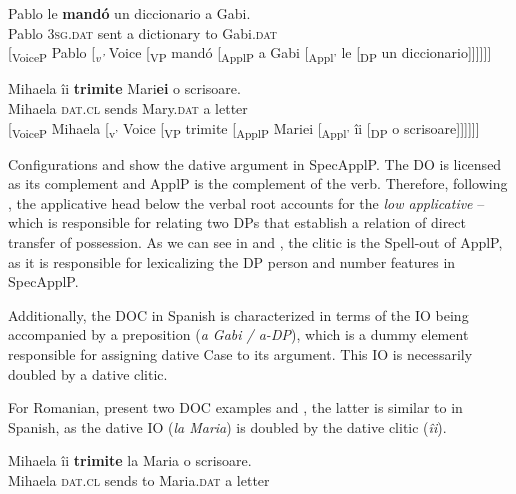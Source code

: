 \documentclass[output=paper,colorlinks,citecolor=brown,nonflat]{./langscibook}
\begin{document}
\ea%
    \label{ex:calindro:4}
    \ea\label{ex:calindro:4a}
    \gll Pablo {le}               \textbf{mandó} un diccionario  {a} {Gabi}. \\
    Pablo \textsc{3sg.dat}  sent      a dictionary     to Gabi.\textsc{dat}\\
    \ex\label{ex:calindro:4b}{}
    [\textsubscript{VoiceP} Pablo [\textit{\textsubscript{v’}} Voice [\textsubscript{VP} mandó [\textsubscript{ApplP} a Gabi [\textsubscript{Appl’} {le} [\textsubscript{DP} un diccionario]]]]]] \hfill \citep[35]{Cuervo2003}
    \z
\z

\ea%
    \label{ex:calindro:5}
    \ea\label{ex:calindro:5a}
    \gll Mihaela  {îi}             \textbf{trimite}   {Mari}\textbf{{ei}}         o scrisoare. \\
    Mihaela  \textsc{dat.cl}  sends   Mary.\textsc{dat}  a letter \\
    \ex\label{ex:calindro:5b}{}
    [\textsubscript{VoiceP} Mihaela [{\textsubscript{v’}} Voice [\textsubscript{VP} trimite [\textsubscript{ApplP} Mariei [\textsubscript{Appl’} îi [\textsubscript{DP} o scrisoare]]]]]] \hfill \citep[2]{DiaconescuRivero2007}
    \z
\z

Configurations  and  show the dative argument in SpecApplP. The DO is licensed as its complement and ApplP is the complement of the verb. Therefore, following \citet{Pylkkänen2002}, the applicative head below the verbal root accounts for the \textit{low applicative} – which is responsible for relating two DPs that establish a relation of direct transfer of possession. As we can see in  and , the clitic is the Spell-out of ApplP, as it is responsible for lexicalizing the DP person and number features in SpecApplP. 

Additionally, the DOC in Spanish is characterized in terms of the IO being accompanied by a preposition (\textit{a Gabi / a-DP}), which is a dummy element responsible for assigning dative Case to its argument. This IO is necessarily doubled by a dative clitic. 

For Romanian, \citet{DiaconescuRivero2007} present two DOC examples  and , the latter is similar to  in Spanish, as the dative IO (\textit{la Maria}) is doubled by the dative clitic (\textit{îi}).

\ea%
    \label{ex:calindro:6}
    \gll Mihaela {îi}    \textbf{trimite}   {la} {Maria}    o scrisoare.\\
    Mihaela \textsc{dat.cl}  sends     to Maria.\textsc{dat}  a letter\\
    \glt ~\hfill \citep[14]{DiaconescuRivero2007}
    \z
\end{document}
